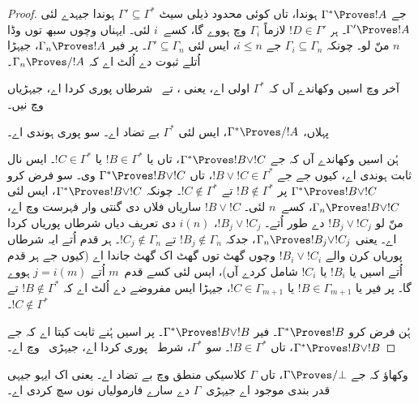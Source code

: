 \documentclass[../../../include/open-logic-section]{subfiles}
\begin{document}
\begin{proof}
  جے $\Gamma^* \Proves !A$ ہوندا، تاں کوئی محدود ذیلی سیٹ $\Gamma'
  \subseteq \Gamma^*$ ہوندا جیہدے لئی $\Gamma' \Proves !A$۔
  ہر $!D \in \Gamma'$ لازماً $\Gamma_i$ وچ ہووے گا، کسے~$i$ لئی۔
  ایہناں وچوں سبھ توں وڈا $n$ منّ لو۔ چونکہ $\Gamma_i \subseteq \Gamma_n$
  جے $i \le n$، ایس لئی $\Gamma' \subseteq \Gamma_n$۔ پر فیر
  $\Gamma_n \Proves !A$، جیہڑا اُتلے ثبوت دے اُلٹ اے کہ $\Gamma_n \Proves/ !A$۔

  آخر وچ اسیں وکھاندے آں کہ $\Gamma^*$ اولی اے، یعنی
  ،  تے~ شرطاں
  پوری کردا اے، جیہڑیاں  وچ نیں۔

  پہلاں، $\Gamma^* \Proves/ !A$، ایس لئی $\Gamma^*$ بے تضاد اے۔
  سو  پوری ہوندی اے۔

  ہُن اسیں وکھاندے آں کہ جے $\Gamma^* \Proves !B \lor !C$، تاں یا
  $!B \in \Gamma^*$ یا $!C \in \Gamma^*$۔ ایس نال 
  ثابت ہوندی اے، کیوں جے جے $!B \lor !C \in \Gamma^*$، تاں
  $\Gamma^* \Proves !B \lor !C$ وی۔ سو فرض کرو $\Gamma^* \Proves !B \lor !C$
  پر $!B \notin \Gamma^*$ تے $!C \notin \Gamma^*$۔ چونکہ $\Gamma^* \Proves
  !B \lor !C$، ایس لئی $\Gamma_n \Proves !B \lor !C$، کسے~$n$ لئی۔
  $!B \lor !C$ ساریاں فلاں دی گنتی وار فہرست وچ اے، منّ لو $!B_j \lor !C_j$
  دے طور اُتے۔ $!B_j \lor !C_j$، $i(n)$ دی تعریف دیاں شرطاں پوریاں کردا اے۔
  یعنی $\Gamma_n \Proves !B_j \lor !C_j$، جدکہ $!B_j \notin \Gamma_n$
  تے $!C_j \notin \Gamma_n$۔ ہر قدم اُتے ایہ شرطاں پوریاں کرن والے
  $!B_i \lor !C_i$ وچوں گھٹ توں گھٹ اک گھٹ جاندا اے (کیوں جے ہر قدم اُتے اسیں
  یا $!B_i$ یا $!C_i$ شامل کردے آں)، ایس لئی کسے قدم~$m$ اُتے $j = i(m)$ ہووے گا۔
  پر فیر یا $!B \in \Gamma_{m+1}$ یا $!C \in \Gamma_{m+1}$، جیہڑا
  ایس مفروضے دے اُلٹ اے کہ $!B \notin \Gamma^*$ تے $!C \notin \Gamma^*$۔

  ہُن فرض کرو $\Gamma^* \Proves !B$۔ فیر $\Gamma^* \Proves !B \lor !B$۔
  پر اسیں ہُنے ثابت کیتا اے کہ جے $\Gamma^* \Proves !B \lor !B$، تاں
  $!B \in \Gamma^*$۔ سو $\Gamma^*$، شرط~
  پوری کردا اے، جیہڑی~ وچ اے۔
\end{proof}

\begin{prob}
وکھاؤ کہ جے $\Gamma \Proves/ \bot$، تاں $\Gamma$ کلاسیکی منطق وچ بے تضاد
اے۔ یعنی اک ایہو جیہی قدر بندی موجود اے جیہڑی~$\Gamma$ دے سارے فارمولیاں
نوں سچ کردی اے۔
\end{prob}
\end{document}
